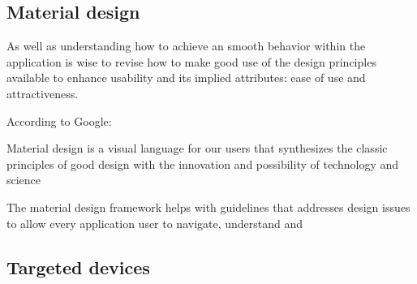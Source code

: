 \subsection{Material design}
As well as understanding how to achieve an smooth behavior within the application is wise to revise how to make good use of the design principles available to enhance usability and its implied attributes: ease of use and attractiveness. 

According to Google: \begin{displayquote}Material design is  a visual language for our users that synthesizes the classic principles of good design with the innovation and possibility of technology and science \end{displayquote} 

The material design framework helps with guidelines that addresses design issues to allow every application user to navigate, understand and  

\subsection{Targeted devices}